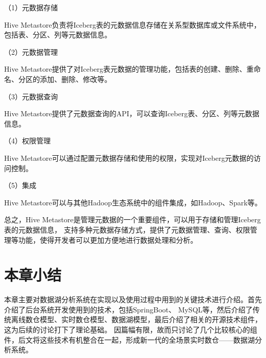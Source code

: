 （1）元数据存储

Hive Metastore负责将Iceberg表的元数据信息存储在关系型数据库或文件系统中，包括表、分区、列等元数据信息。

（2）元数据管理

Hive Metastore提供了对Iceberg表元数据的管理功能，包括表的创建、删除、重命名、分区的添加、删除、修改等。

（3）元数据查询

Hive Metastore提供了元数据查询的API，可以查询Iceberg表、分区、列等元数据信息。

（4）权限管理

Hive Metastore可以通过配置元数据存储和使用的权限，实现对Iceberg元数据的访问控制。

（5）集成

Hive Metastore可以与其他Hadoop生态系统中的组件集成，如Hadoop、Spark等。

总之，Hive Metastore是管理元数据的一个重要组件，可以用于存储和管理Iceberg表的元数据信息，
支持多种元数据存储方式，提供了元数据管理、查询、权限管理等功能，使得开发者可以更加方便地进行数据处理和分析。

\section{本章小结}

本章主要对数据湖分析系统在实现以及使用过程中用到的关键技术进行介绍。首先介绍了后台系统开发使用到的技术，包括SpringBoot、
MySQL等，然后介绍了传统离线数仓模型、实时数仓模型、数据湖模型，最后介绍了相关的开源技术组件，这为后续的讨论打下了理论基础。
因篇幅有限，故而只讨论了几个比较核心的组件，后文将这些技术有机整合在一起，形成新一代的全场景实时数仓——数据湖分析系统。
